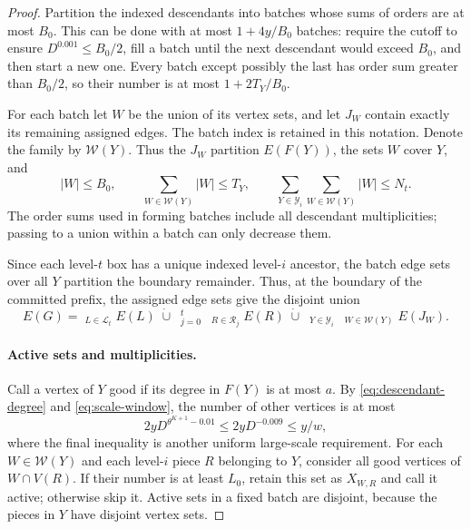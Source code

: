 \begin{proof}
Partition the indexed descendants into batches whose sums of
orders are at most \(B_0\). This can be done with at most
\(1+4y/B_0\) batches: require the cutoff to ensure
\(D^{0.001}\le B_0/2\), fill a batch until the next descendant
would exceed \(B_0\), and then start a new one. Every batch
except possibly the last has order sum greater than \(B_0/2\),
so their number is at most \(1+2T_Y/B_0\).

For each batch let \(W\) be the union of its vertex sets, and
let \(J_W\) contain exactly its remaining assigned edges. The
batch index is retained in this notation. Denote the family by
\(\mathcal W(Y)\). Thus the \(J_W\) partition \(E(F(Y))\),
the sets \(W\) cover \(Y\), and
\begin{equation}\label{eq:batch-orders}
 |W|\le B_0,\qquad
 \sum_{W\in\mathcal W(Y)}|W|\le T_Y,\qquad
 \sum_{Y\in\mathcal Y_i}\sum_{W\in\mathcal W(Y)}|W|
 \le N_t.
\end{equation}
The order sums used in forming batches include all descendant
multiplicities; passing to a union within a batch can only
decrease them.

Since each level-\(t\) box has a unique indexed level-\(i\)
ancestor, the batch edge sets over all \(Y\) partition the boundary
remainder. Thus, at the boundary of the committed prefix, the
assigned edge sets give the disjoint union
\begin{equation}\label{eq:global-edge-ledger}
 E(G)=
 \mathop{\dot\bigcup}_{L\in\mathcal L_t}E(L)
 \;\dot\cup\;
 \mathop{\dot\bigcup}_{j=0}^{t}\ 
             \mathop{\dot\bigcup}_{R\in\mathcal R_j}E(R)
 \;\dot\cup\;
 \mathop{\dot\bigcup}_{Y\in\mathcal Y_i}\ 
             \mathop{\dot\bigcup}_{W\in\mathcal W(Y)}E(J_W).
\end{equation}

\paragraph{Active sets and multiplicities.}
Call a vertex of \(Y\) good if its degree in \(F(Y)\) is at
most \(a\). By \eqref{eq:descendant-degree} and
\eqref{eq:scale-window}, the number of other vertices is at most
\[
 2yD^{\theta^{K+1}-0.01}\le2yD^{-0.009}\le y/w,
\]
where the final inequality is another uniform large-scale
requirement. For each \(W\in\mathcal W(Y)\) and each
level-\(i\) piece \(R\) belonging to \(Y\), consider all
good vertices of \(W\cap V(R)\). If their number is at least
\(L_0\), retain this set as \(X_{W,R}\) and call it active;
otherwise skip it. Active sets in a fixed batch are disjoint,
because the pieces in \(Y\) have disjoint vertex sets.


\end{proof}
